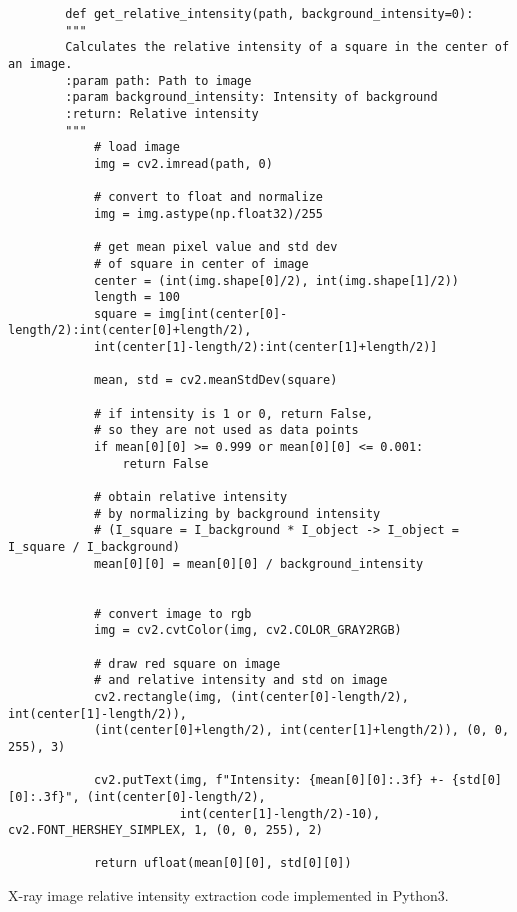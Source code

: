 \begin{listing}[H]
    \begin{verbatim}
        def get_relative_intensity(path, background_intensity=0):
        """
        Calculates the relative intensity of a square in the center of an image.
        :param path: Path to image
        :param background_intensity: Intensity of background
        :return: Relative intensity
        """
            # load image
            img = cv2.imread(path, 0)
        
            # convert to float and normalize
            img = img.astype(np.float32)/255
        
            # get mean pixel value and std dev 
            # of square in center of image
            center = (int(img.shape[0]/2), int(img.shape[1]/2))
            length = 100
            square = img[int(center[0]-length/2):int(center[0]+length/2), 
            int(center[1]-length/2):int(center[1]+length/2)]
        
            mean, std = cv2.meanStdDev(square)
        
            # if intensity is 1 or 0, return False,
            # so they are not used as data points
            if mean[0][0] >= 0.999 or mean[0][0] <= 0.001:
                return False
        
            # obtain relative intensity
            # by normalizing by background intensity
            # (I_square = I_background * I_object -> I_object = I_square / I_background)
            mean[0][0] = mean[0][0] / background_intensity
        
        
            # convert image to rgb
            img = cv2.cvtColor(img, cv2.COLOR_GRAY2RGB)
        
            # draw red square on image
            # and relative intensity and std on image
            cv2.rectangle(img, (int(center[0]-length/2), int(center[1]-length/2)),
            (int(center[0]+length/2), int(center[1]+length/2)), (0, 0, 255), 3)
        
            cv2.putText(img, f"Intensity: {mean[0][0]:.3f} +- {std[0][0]:.3f}", (int(center[0]-length/2),
                        int(center[1]-length/2)-10), cv2.FONT_HERSHEY_SIMPLEX, 1, (0, 0, 255), 2)
        
            return ufloat(mean[0][0], std[0][0])
    \end{verbatim}
    \caption{X-ray image relative intensity extraction code implemented in Python3.}
    \label{lst::extractionCode}
    \end{listing}

